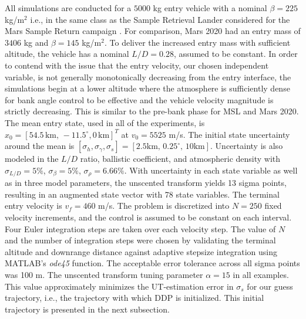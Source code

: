 \documentclass[journal ]{new-aiaa}
\begin{document}
All simulations are conducted for a $5000$ kg entry vehicle with a nominal $\beta=225$ kg/$\mathrm{m}^2 $ i.e., in the same class as the Sample Retrieval Lander considered for the Mars Sample Return campaign \cite{MSR}. For comparison, Mars 2020 had an entry mass of $3406$ kg and $\beta =  145$ kg/$\mathrm{m}^2 $. To deliver the increased entry mass with sufficient altitude, the vehicle has a nominal $L/D=0.28$, assumed to be constant.
In order to contend with the issue that the entry velocity, our chosen independent variable, is not generally monotonically decreasing from the entry interface, 
the simulations begin at a lower altitude where the atmosphere is sufficiently dense for bank angle control to be effective and the vehicle velocity magnitude is strictly decreasing. This is similar to the pre-bank phase for MSL and Mars 2020. The mean entry state, used in all of the experiments, is $x_0 = [54.5\,\mathrm{km},\,-11.5^{\circ}, 0\,\mathrm{km}]^T$ at $v_0 = 5525$ m/s. The initial state uncertainty around the mean is $[\sigma_h, \sigma_{\gamma}, \sigma_s ] = [2.5 \mathrm{km},\, 0.25^{\circ},\, 10\mathrm{ km}]$. Uncertainty is also modeled in the $L/D$ ratio, ballistic coefficient, and atmospheric density with $\sigma_{L/D} = 5\%$, $\sigma_{\beta} = 5\%$, $\sigma_{\rho} = 6.66\%$. With uncertainty in each state variable as well as in three model parameters, the unscented transform yields 13 sigma points, resulting in an augmented state vector with 78 state variables. The terminal entry velocity is $v_f=460$ m/s. The problem is discretized into $N=250$ fixed velocity increments, and the control is assumed to be constant on each interval. Four Euler integration steps are taken over each velocity step. The value of $ N $ and the number of integration steps were chosen by validating the terminal altitude and downrange distance against adaptive stepsize integration using MATLAB's \textit{ode45} function. The acceptable error tolerance across all sigma points was 100 m. The unscented transform tuning parameter $\alpha=15$ in all examples. This value approximately minimizes the UT-estimation error in $\sigma_s$ for our guess trajectory, i.e., the trajectory with which DDP is initialized. This initial trajectory is presented in the next subsection.
\end{document}
